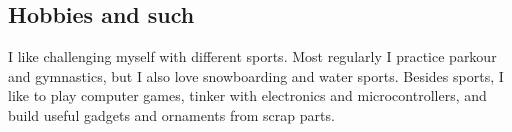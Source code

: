 \documentclass[letterpaper]{twentysecondcv}
\begin{document}
\subsection{Hobbies and such}

  I like challenging myself with different sports.
  Most regularly I practice parkour and gymnastics,
  but I also love snowboarding and water sports.
  Besides sports, I like to play computer games,
  tinker with electronics and micro\-controllers,
  and build useful gadgets and ornaments from scrap parts.










\end{document}
